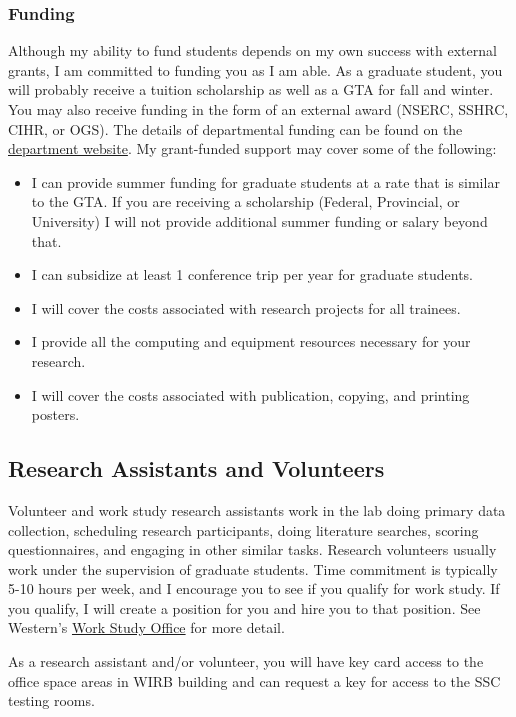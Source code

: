 \documentclass{article}
\begin{document}
\subsubsection{Funding} Although my ability to fund students depends on my own success with external grants, I am committed to funding you as I am able. As a graduate student, you will probably receive a tuition scholarship as well as a GTA for fall and winter. You may also receive funding in the form of an external award (NSERC, SSHRC, CIHR, or OGS). The details of departmental funding can be found on the \href{http://psychology.uwo.ca/graduate/index.html}{department website}. My grant-funded support may cover some of the following:

\begin{itemize}
\item I can provide summer funding for graduate students at a rate that is similar to the GTA. If you are receiving a scholarship (Federal, Provincial, or University) I will not provide additional summer funding or salary beyond that.
\item I can subsidize at least 1 conference trip per year for graduate students.
\item I will cover the costs associated with research projects for all trainees. 
\item I provide all the computing and equipment resources necessary for your research.
\item I will cover the costs associated with publication, copying, and printing posters.
\end{itemize}


\subsection {Research Assistants and Volunteers}
Volunteer and work study research assistants work in the lab doing primary data collection, scheduling research participants, doing literature searches, scoring questionnaires, and engaging in other similar tasks. Research volunteers usually work under the supervision of graduate students. Time commitment is typically 5-10 hours per week, and I encourage you to see if you qualify for work study. If you qualify, I will create a position for you and hire you to that position. See Western's \href{https://workstudy.uwo.ca/}{Work Study Office} for more detail. 

As a research assistant and/or volunteer, you will have key card access to the office space areas in WIRB building and can request a key for access to the SSC testing rooms.
 
\end{document}
